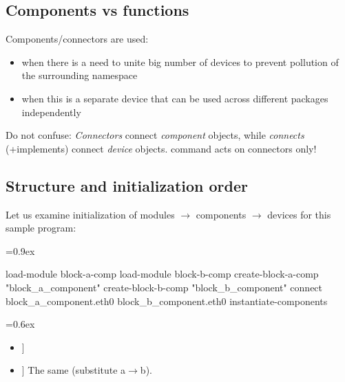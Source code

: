 \documentclass[8pt]{extarticle}
\newcommand{\mywarning}{{\huge \warning}}
\newcommand{\circled}[1]{\Circled{\textbf{#1}}}
\newenvironment{code}[1][]{%
\begin{prebox}[#1]\obeylines%
\fontdimen2\font=0.9ex%
}{%
\end{prebox}%
\fontdimen2\font=0.6ex%
}
\newcommand{\cod}[2][green!10]{\tcbox[
    size=fbox,
    on line,
    colback=#1,
    colframe=black,
    arc=0.3em  %
]{#2}}
\begin{document}
\begin{multicols*}{3}
\subsection{Components vs functions}

Components/connectors are used:
\begin{itemize}
    \item when there is a need to unite big number of devices
        to prevent pollution of the surrounding namespace
    \item when this is a separate device that can be used across
        different packages independently
\end{itemize}

\mywarning Do not confuse: \textit{Connectors} connect \textit{component}
objects, while \textit{connects} (+implements) connect \textit{device}
objects. \cod{connect} command acts on connectors only!

\subsection{Structure and initialization order}

Let us examine initialization of modules $\longrightarrow$ components
$\longrightarrow$ devices for this sample program:

\begin{code}
\circled{1} load-module block-a-comp
\circled{2} load-module block-b-comp
\circled{3} create-block-a-comp "block_a_component"
\circled{4} create-block-b-comp "block_b_component"
\circled{5} connect block_a_component.eth0 block_b_component.eth0
\circled{6} instantiate-components
\end{code}

\begin{itemize}[left=1.5em]
    \item[\cod{\circled{1}}]
        \begin{minipage}[t]{\linewidth}
        \end{minipage}
    \item[\cod{\circled{2}}] The same (substitute a$→$b).


\end{itemize}
\end{multicols*}
\end{document}
